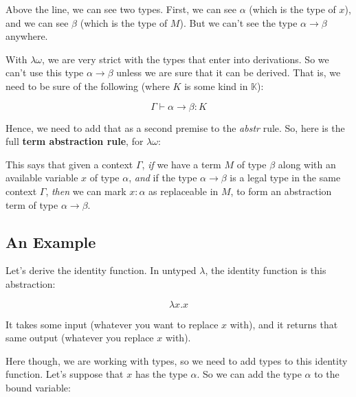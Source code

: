 \documentclass{book}
\numberwithin{equation}{chapter}
\newcommand{\vocab}{\textbf}
\begin{document}
\noindent
Above the line, we can see two types. First, we can see $\alpha$ (which is the type of $x$), and we can see $\beta$ (which is the type of $M$). But we can't see the type $\alpha \rightarrow \beta$ anywhere. 

With $\lambda\omega$, we are very strict with the types that enter into derivations. So we can't use this type $\alpha \rightarrow \beta$ unless we are sure that it can be derived. That is, we need to be sure of the following (where $K$ is some kind in $\mathbb{K}$):

\begin{equation}
\Gamma \vdash \alpha \rightarrow \beta : K
\end{equation}

\noindent
Hence, we need to add that as a second premise to the \textit{abstr} rule. So, here is the full \vocab{term abstraction rule}, for $\lambda\omega$: 

\begin{prooftree}
\end{prooftree}

\noindent
This says that given a context $\Gamma$, \textit{if} we have a term $M$ of type $\beta$ along with an available variable $x$ of type $\alpha$, \textit{and} if the type $\alpha \rightarrow \beta$ is a legal type in the same context $\Gamma$, \textit{then} we can mark $x : \alpha$ as replaceable in $M$, to form an abstraction term of type $\alpha \rightarrow \beta$.


\subsection{An Example}

Let's derive the identity function. In untyped $\lambda$, the identity function is this abstraction:

\begin{equation}
\lambda x.x
\end{equation}

\noindent
It takes some input (whatever you want to replace $x$ with), and it returns that same output (whatever you replace $x$ with).

Here though, we are working with types, so we need to add types to this identity function. Let's suppose that $x$ has the type $\alpha$. So we can add the type $\alpha$ to the bound variable:
\end{document}
